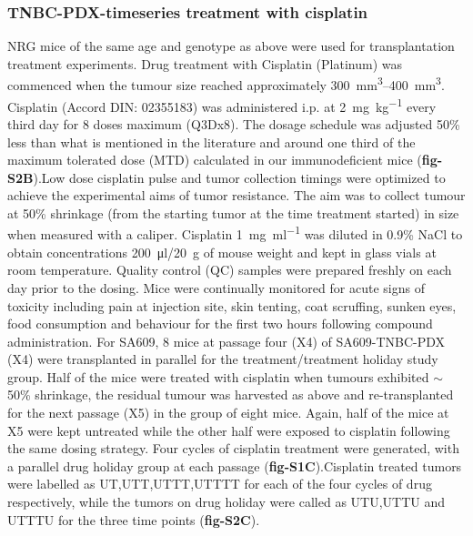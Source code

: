 \documentclass{article}
\begin{document}
\subsubsection{TNBC-PDX-timeseries treatment with cisplatin}
\label{ssec:rx}
NRG mice of the same age and genotype as above were used for transplantation treatment experiments. Drug treatment with Cisplatin (Platinum) was commenced when the tumour size reached approximately \SIrange{300}{400}{\mm\cubed}. Cisplatin (Accord DIN: 02355183)  was administered i.p. at \SI{2}{\mg\per\kg} every third day for 8 doses maximum (Q3Dx8). The dosage schedule was adjusted 50\% less than what is mentioned in the literature \cite{li2013enhanced,wang2013klotho} and around one third of the maximum tolerated dose (MTD) calculated in our immunodeficient mice (\textbf{fig-S2B}).Low dose cisplatin pulse and tumor collection timings were optimized to achieve the experimental aims of tumor resistance. The aim was to collect tumour at 50\% shrinkage (from the starting tumor at the time treatment started) in size when measured with a caliper. Cisplatin \SI{1}{\mg\per\ml} was diluted in 0.9\% NaCl to obtain concentrations \SI{200}{\ul}/\SI{20}{\g} of mouse weight and kept in glass vials at room temperature. Quality control (QC) samples were prepared freshly on each day prior to the dosing. Mice were continually monitored for acute signs of toxicity including pain at injection site, skin tenting, coat scruffing, sunken eyes, food consumption and behaviour for the first two hours following compound administration. For SA609, 8 mice at passage four (X4) of SA609-TNBC-PDX (X4) were transplanted in parallel for the treatment/treatment holiday study group. Half of the mice were treated with cisplatin when tumours exhibited $\sim$ 50\% shrinkage, the residual tumour was harvested as above and re-transplanted for the next passage (X5) in the group of eight mice. Again, half of the mice at X5 were kept untreated while the other half were exposed to cisplatin following the same dosing strategy. Four cycles of cisplatin treatment were generated, with a parallel drug holiday group at each passage (\textbf{fig-S1C}).Cisplatin treated tumors were labelled as UT,UTT,UTTT,UTTTT for each of the four cycles of drug respectively, while the tumors on drug holiday were called as UTU,UTTU and UTTTU for the three time points (\textbf{fig-S2C}).

 
\end{document}
